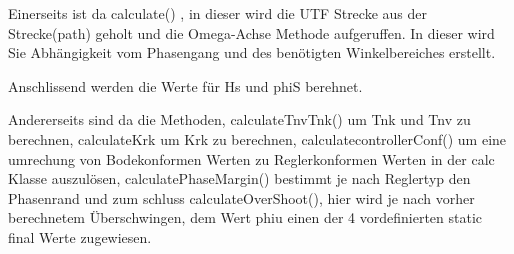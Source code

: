 Einerseits  ist da  calculate()  , in  dieser  wird die  UTF  Strecke aus  der
Strecke(path)  geholt  und  die  Omega-Achse  Methode  aufgeruffen. In  dieser
wird Sie  Abh\"angigkeit vom  Phasengang und des  ben\"otigten Winkelbereiches
erstellt.

Anschlissend werden die Werte f\"ur Hs und phiS berehnet.

Andererseits  sind  da die  Methoden,  calculateTnvTnk()  um  Tnk und  Tnv  zu
berechnen, calculateKrk um Krk zu berechnen, calculatecontrollerConf() um eine
umrechung  von Bodekonformen  Werten  zu Reglerkonformen  Werten  in der  calc
Klasse  auszul\"osen, calculatePhaseMargin()  bestimmt je  nach Reglertyp  den
Phasenrand  und zum  schluss calculateOverShoot(),  hier wird  je nach  vorher
berechnetem \"Uberschwingen, dem  Wert phiu einen der  4 vordefinierten static
final Werte zugewiesen.
